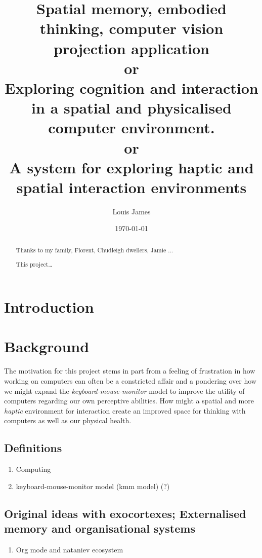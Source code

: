 \documentclass[12pt]{report}
\author{Louis James}
\date{\today}
\title{Spatial memory, embodied thinking, computer vision projection application \\
or \\
Exploring cognition and interaction in a spatial and physicalised computer environment. \\
or \\
A system for exploring haptic and spatial interaction environments}
\begin{document}
\maketitle

\renewcommand{\abstractname}{Acknowledgements}
\begin{abstract}
 Thanks to my family, Florent, Chudleigh dwellers, Jamie ...
\end{abstract}
\newpage

\renewcommand{\abstractname}{Abstract}
\begin{abstract}
This project\ldots{}
\end{abstract}
\tableofcontents
\chapter{Introduction}
\label{sec:orgfdd50b0}
\chapter{Background}
\label{sec:org43f6876}

The motivation for this project stems in part from a feeling of frustration in
how working on computers can often be a constricted affair and a pondering over
how we might expand the \emph{keyboard-mouse-monitor} model to improve the utility of
computers regarding our own perceptive abilities. How might a spatial and more
\emph{haptic} environment for interaction create an improved space for thinking with
computers as well as our physical health.

\section{Definitions}
\label{sec:org917710e}
\begin{enumerate}
\item Computing
\label{sec:org32fe2f3}
\item keyboard-mouse-monitor model (kmm model) (?)
\label{sec:orgc511e0d}
\end{enumerate}

\section{Original ideas with exocortexes; Externalised memory and organisational systems}
\label{sec:org36a782a}

\begin{enumerate}
\item Org mode and nataniev ecosystem
\label{sec:org7fdf1b4}
\end{enumerate}
\end{document}
